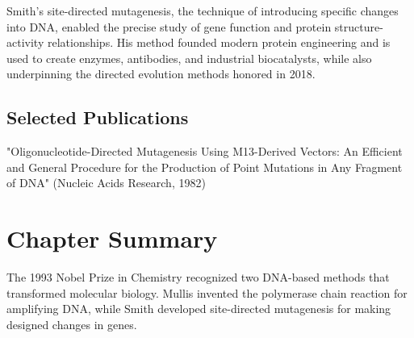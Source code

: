 Smith's site-directed mutagenesis, the technique of introducing specific changes into DNA, enabled the precise study of gene function and protein structure-activity relationships. His method founded modern protein engineering and is used to create enzymes, antibodies, and industrial biocatalysts, while also underpinning the directed evolution methods honored in 2018.

\subsection*{Selected Publications}

"Oligonucleotide-Directed Mutagenesis Using M13-Derived Vectors: An Efficient and General Procedure for the Production of Point Mutations in Any Fragment of DNA" (Nucleic Acids Research, 1982)

\clearpage

\section*{Chapter Summary}

The 1993 Nobel Prize in Chemistry recognized two DNA-based methods that transformed molecular biology. Mullis invented the polymerase chain reaction for amplifying DNA, while Smith developed site-directed mutagenesis for making designed changes in genes.
